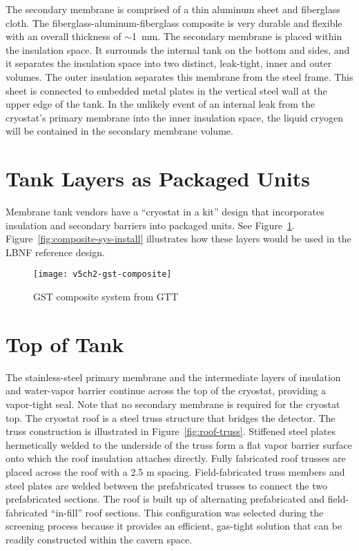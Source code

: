 The secondary membrane is comprised of a thin aluminum sheet and 
fiberglass cloth. The fiberglass-aluminum-fiberglass composite is 
very durable and flexible with an overall thickness of $\sim$1~mm.  
The secondary membrane is placed within the insulation space. It 
surrounds the internal tank on the bottom and sides, and it 
separates the insulation space into two distinct, leak-tight, 
inner and outer volumes. The outer insulation separates this 
membrane from the steel frame. This sheet is connected to embedded 
metal plates in the vertical steel wall at the upper edge of
the tank. In the unlikely event of an internal leak from the 
cryostat's primary membrane into the inner insulation space, the liquid cryogen will be contained in the 
secondary membrane volume.  

\section{Tank Layers as Packaged Units}
Membrane tank vendors have a ``cryostat in a kit'' design that 
incorporates insulation and secondary barriers into packaged units. See Figure~\ref{fig:gst-composite}.  
Figure~\ref{fig:composite-sys-install} illustrates how these layers would be used in the LBNF reference design.

\begin{figure}[htbp]
\centering
\texttt{[image: v5ch2-gst-composite]}
\caption{GST composite system from GTT}
\label{fig:gst-composite}
\end{figure}

\section{Top of Tank}

The stainless-steel primary membrane and the intermediate layers of 
insulation and water-vapor barrier continue across the top of the 
cryostat, providing a vapor-tight seal.  Note that no secondary 
membrane is required for the cryostat top. The cryostat 
roof is a steel truss structure that bridges the detector. The truss 
construction is illustrated in Figure~\ref{fig:roof-truss}. Stiffened 
steel plates hermetically welded to the underside of the truss form 
a flat vapor barrier surface onto which the roof insulation attaches 
directly. Fully fabricated roof
trusses are placed across the roof with a 2.5 m spacing. Field-fabricated 
truss members and steel plates are welded between the prefabricated 
trusses to connect the two prefabricated sections.  The roof is built 
up of alternating prefabricated and field-fabricated ``in-fill'' roof 
sections.  This configuration was selected during the screening process 
because it provides an efficient, gas-tight solution that can be 
readily constructed within the cavern space.

